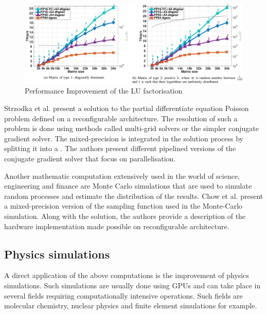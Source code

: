 \begin{figure}[htbp]
	\centering
		\includegraphics[width=\textwidth]{Figures/HaidarPerf.png}
	\caption[Performance Improvement]{Performance Improvement of the LU factorisation \cite{Haidar2018}}
	\label{fig:HaidarPerf}
\end{figure}

Strzodka et al. \cite{Strzodka2006} present a solution to the partial differentiate equation Poisson problem defined on a reconfigurable architecture. The resolution of such a problem is done using methods called multi-grid solvers or the simpler conjugate gradient solver. The mixed-precision is integrated in the solution process by splitting it into a . The authors present different pipelined versions of the conjugate gradient solver that focus on parallelisation.

Another mathematic computation extensively used in the world of science, engineering and finance are Monte Carlo simulations that are used to simulate random processes and estimate the distribution of the results. Chow et al. \cite{Chow2012} present a mixed-precision version of the sampling function used in the Monte-Carlo simulation. Along with the solution, the authors provide a description of the hardware implementation made possible on reconfigurable architecture.


\subsection{Physics simulations}

A direct application of the above computations is the improvement of physics simulations. Such simulations are usually done using GPUs  and can take place in several fields requiring computationally intensive operations. Such fields are molecular chemistry, nuclear physics and finite element simulations for example.

